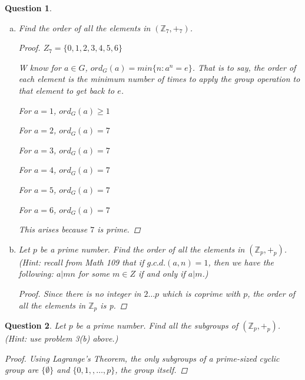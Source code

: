 \documentclass{article}
\newcommand*{\field}[1]{\mathbb{#1}}%
\newtheorem{ques}{Question}
\begin{document}
\begin{ques}
	\begin{enumerate}[(a)]
		\item 
		Find the order of all the elements in $(\field{Z}_7, +_7)$.
		\begin{proof}
			$Z_7 = \{0, 1, 2, 3, 4, 5, 6\}$
			
			W know for $a \in G$, $ord_G(a) = min\{n : a^n = e\}$. That is to say, the order of each element is the minimum number of times to apply the group operation to that element to get back to $e$.
			
			For $a = 1$,  $ord_G(a) \geq 1$
			
			For $a = 2$,  $ord_G(a) = 7$
			
			For $a = 3$,  $ord_G(a) = 7$
			
			For $a = 4$,  $ord_G(a) = 7$
			
			For $a = 5$,  $ord_G(a) = 7$
			
			For $a = 6$,  $ord_G(a) = 7$
			
			
			This arises because $7$ is prime. 
			
		\end{proof}
	
		\item 
		Let $p$ be a prime number. Find the order of all the elements in $(\field{Z}_p, +_p)$.
		(Hint: recall from Math 109 that if $g.c.d.(a, n) = 1$, then we have the
		following: $a|mn$ for some $m \in Z$ if and only if $a|m$.)
		\begin{proof}
			Since there is no integer in $2 \dots p$ which is coprime with $p$, the order of all the elements in $\field{Z}_p$ is p.
		\end{proof}
	\end{enumerate}	
\end{ques}

\begin{ques}
	Let $p$ be a prime number. Find all the subgroups of $(\field{Z}_p, +_p)$. (Hint: use
	problem 3(b) above.)
	\begin{proof}
		Using Lagrange's Theorem, the only subgroups of a prime-sized cyclic group are $\{\emptyset\}$ and $\{0, 1,, \dots, p\}$, the group itself.
	\end{proof}
\end{ques}
\end{document}
